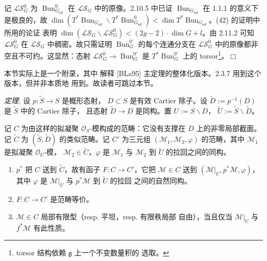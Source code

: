 
记 $\mathcal{LS}^0_G$ 为 $\operatorname{Bun}^0_{G_{ad}}$ 在
$\mathcal{LS}_G$ 中的原像。2.10.5 中已证
$\operatorname{Bun}_{G_{ad}}$ 在 1.1.1 的意义下是极良的，故
$\dim(T^{*}\operatorname{Bun}_{G_{ad}}
\backslash T^{*}\operatorname{Bun}^0_{G_{ad}})
<\dim T^{*}\operatorname{Bun}_{G_{ad}}$。(42) 的证明中所用的论证
表明 $\dim(\mathcal{LS}_G\backslash\mathcal{LS}^0_G)
<(2g-2)\cdot\dim G+l$。由 2.11.2 可知 $\mathcal{LS}^0_G$ 在
$\mathcal{LS}_G$ 中稠密。故只需证明
$\operatorname{Bun}^{0\prime}_G$ 的每个连通分支在
$\mathcal{LS}^0_G$ 中的原像都非空且不可约。这显然：态射
$\mathcal{LS}^0_G\to\operatorname{Bun}^{0\prime}_G$ 是
$T^{*}\operatorname{Bun}^{0\prime}_G$ 上的
torsor\footnote{torsor 结构依赖 $\mathfrak{g}$ 上一个不变数量积的
选取。}。\hfill$\Box$

 本节实际上是一个附录，其中
解释 [BLa95] 主定理的整体化版本。2.3.7 用到这个版本，但并非本质地
用到。故读者可跳过本节。

 \emph{定理.} 设 $p:\widetilde{S}\to S$ 是概形态射，
$D\subset S$ 是有效 Cartier 除子。设
$\widetilde{D}:=p^{-1}(D)$ 是 $\widetilde{S}$ 中的 Cartier 除子，
且态射 $\widetilde{D}\to D$ 是同构。置 $U:=S\backslash D$，
$\widetilde{U}:=\widetilde{S}\backslash\widetilde{D}$。

记 $C$ 为由这样的拟凝聚 $\mathcal{O}_S$-模构成的范畴：它没有支撑在
$D$ 上的非零局部截面。记 $\widetilde{C}$ 为
$(\widetilde{S},\widetilde{D})$ 的类似范畴。记 $C'$ 为三元组
$(\mathcal{M}_1,\mathcal{M}_2,\varphi)$ 的范畴，其中
$\mathcal{M}_1$ 是拟凝聚 $\mathcal{O}_U$-模，
$\mathcal{M}_2\in\widetilde{C}$，$\varphi$ 是 $\mathcal{M}_1$ 与
$\mathcal{M}_2$ 到 $\widetilde{U}$ 的拉回之间的同构。
\begin{enumerate}[label=\arabic*),leftmargin=2.2em]
\item $p^{*}$ 把 $C$ 送到 $\widetilde{C}$，故有函子
  $F:C\to C'$，它把 $\mathcal{M}\in C$ 送到
  $(\mathcal{M}|_U,p^{*}\mathcal{M},\varphi)$，其中 $\varphi$ 是
  $\mathcal{M}|_U$ 与 $p^{*}\mathcal{M}$ 到 $\widetilde{U}$ 的拉回
  之间的自然同构。
\item $F:C\to C'$ 是范畴等价。
\item $\mathcal{M}\in C$ 局部有限型（resp. 平坦，resp. 有限秩局部
  自由），当且仅当 $\mathcal{M}|_U$ 与 $f^{*}\mathcal{M}$ 有此性质。
\end{enumerate}

